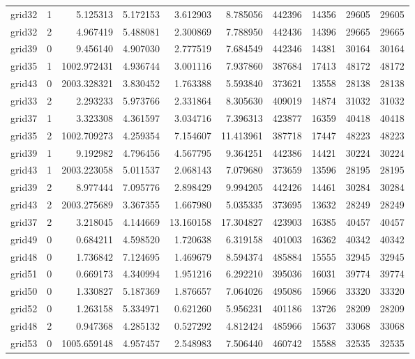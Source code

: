 \begin{longtable}{|l|r|r|r|r|r|r|r|r|r|}
grid32 & 1 & 5.125313 & 5.172153 & 3.612903 & 8.785056 & 442396 & 14356 & 29605 & 29605 \\
grid32 & 2 & 4.967419 & 5.488081 & 2.300869 & 7.788950 & 442436 & 14396 & 29665 & 29665 \\
grid39 & 0 & 9.456140 & 4.907030 & 2.777519 & 7.684549 & 442346 & 14381 & 30164 & 30164 \\
grid35 & 1 & 1002.972431 & 4.936744 & 3.001116 & 7.937860 & 387684 & 17413 & 48172 & 48172 \\
grid43 & 0 & 2003.328321 & 3.830452 & 1.763388 & 5.593840 & 373621 & 13558 & 28138 & 28138 \\
grid33 & 2 & 2.293233 & 5.973766 & 2.331864 & 8.305630 & 409019 & 14874 & 31032 & 31032 \\
grid37 & 1 & 3.323308 & 4.361597 & 3.034716 & 7.396313 & 423877 & 16359 & 40418 & 40418 \\
grid35 & 2 & 1002.709273 & 4.259354 & 7.154607 & 11.413961 & 387718 & 17447 & 48223 & 48223 \\
grid39 & 1 & 9.192982 & 4.796456 & 4.567795 & 9.364251 & 442386 & 14421 & 30224 & 30224 \\
grid43 & 1 & 2003.223058 & 5.011537 & 2.068143 & 7.079680 & 373659 & 13596 & 28195 & 28195 \\
grid39 & 2 & 8.977444 & 7.095776 & 2.898429 & 9.994205 & 442426 & 14461 & 30284 & 30284 \\
grid43 & 2 & 2003.275689 & 3.367355 & 1.667980 & 5.035335 & 373695 & 13632 & 28249 & 28249 \\
grid37 & 2 & 3.218045 & 4.144669 & 13.160158 & 17.304827 & 423903 & 16385 & 40457 & 40457 \\
grid49 & 0 & 0.684211 & 4.598520 & 1.720638 & 6.319158 & 401003 & 16362 & 40342 & 40342 \\
grid48 & 0 & 1.736842 & 7.124695 & 1.469679 & 8.594374 & 485884 & 15555 & 32945 & 32945 \\
grid51 & 0 & 0.669173 & 4.340994 & 1.951216 & 6.292210 & 395036 & 16031 & 39774 & 39774 \\
grid50 & 0 & 1.330827 & 5.187369 & 1.876657 & 7.064026 & 495086 & 15966 & 33320 & 33320 \\
grid52 & 0 & 1.263158 & 5.334971 & 0.621260 & 5.956231 & 401186 & 13726 & 28209 & 28209 \\
grid48 & 2 & 0.947368 & 4.285132 & 0.527292 & 4.812424 & 485966 & 15637 & 33068 & 33068 \\
grid53 & 0 & 1005.659148 & 4.957457 & 2.548983 & 7.506440 & 460742 & 15588 & 32535 & 32535 \\

\end{longtable}
